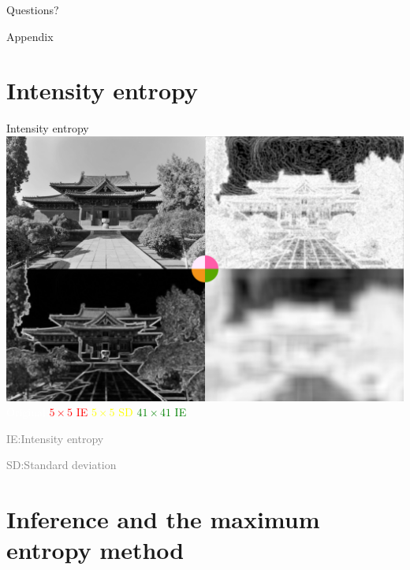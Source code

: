 \documentclass[14pt,c]{beamer}
\begin{document}
\appendix

\begin{frame}[c]
  \begin{center}
  \Large
  Questions?
  \end{center}
\end{frame}

\begin{frame}{Appendix}
  \centering
  \tableofcontents
\end{frame}

\section{Intensity entropy}

\begin{frame}{Intensity entropy}
  \centering
  \includegraphics[width=0.75\framewidth]{intensity_entropy}
  \\
  \textcolor{white}{Original}\;
  \textcolor{red}{$5\times5$ IE}\;
  \textcolor{yellow}{$5\times5$ SD}\;
  \textcolor{green}{$41\times41$ IE}

  \small
  \textcolor{gray}{IE:\@ Intensity entropy}

  \textcolor{gray}{SD:\@ Standard deviation}
\end{frame}

\section{Inference and the maximum entropy method}
\end{document}
